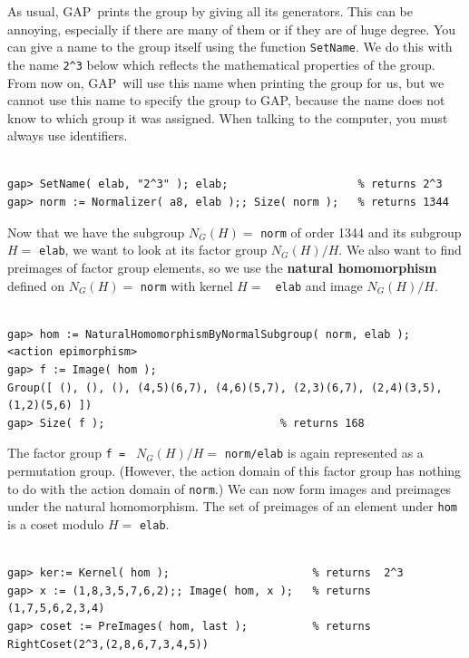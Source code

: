 \documentclass[11pt]{amsart}
\newcommand{\gap}{GAP}   %
\theoremstyle{plain}
\newcommand{\codesize}{\footnotesize}
\newcommand{\<}{\ensuremath{\langle}}
\renewcommand{\>}{\ensuremath{\rangle}}
\begin{document}
\noindent As usual, \gap\ prints the group by giving all its generators. This can be annoying, especially if there are
many of them or if they are of huge degree.  You can give a name to the group itself using
the function {\tt SetName}. 
We do this with the name \verb.2^3. below which reflects the mathematical properties of the
group. From now on, \gap\ will use this name when printing the group for us, but we cannot use this
name to specify the group to \gap, because the name does not know to which group it
was assigned.  When talking to the computer, you must always use identifiers.
{\codesize
\begin{verbatim}

gap> SetName( elab, "2^3" ); elab;                    % returns 2^3
gap> norm := Normalizer( a8, elab );; Size( norm );   % returns 1344

\end{verbatim}}
\noindent Now that we have the subgroup $N_G(H)= $ {\tt norm} of order 1344 and its subgroup $H=
$ {\tt elab}, we want to look at its factor
group $N_G(H)/H$. We also want to find preimages of factor group elements, so we use
the {\bf natural homomorphism} defined on $N_G(H)= $ {\tt norm} with kernel $H= $ {\tt
  elab} and image $N_G(H)/H$.
{\codesize
\begin{verbatim}

gap> hom := NaturalHomomorphismByNormalSubgroup( norm, elab );
<action epimorphism>
gap> f := Image( hom );
Group([ (), (), (), (4,5)(6,7), (4,6)(5,7), (2,3)(6,7), (2,4)(3,5),(1,2)(5,6) ])
gap> Size( f );                           % returns 168

\end{verbatim}}
\noindent The factor group {\tt f = } $ N_G(H)/H = $ {\tt norm/elab} is again represented as a permutation
group. 
(However, the action domain of this factor group has nothing to do with the action
domain of {\tt norm}.)
We can now form images and preimages under the natural homomorphism. The set of
preimages of an element under {\tt hom} is a coset modulo $H= $ {\tt elab}. 
{\codesize
\begin{verbatim}

gap> ker:= Kernel( hom );                      % returns  2^3
gap> x := (1,8,3,5,7,6,2);; Image( hom, x );   % returns  (1,7,5,6,2,3,4)
gap> coset := PreImages( hom, last );          % returns  RightCoset(2^3,(2,8,6,7,3,4,5))

\end{verbatim}}
\end{document}
